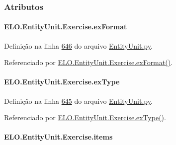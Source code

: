 \subsubsection{Atributos}
\hypertarget{classELO_1_1EntityUnit_1_1Exercise_a0d17db96aa0caa63df47795c50818e9f}{
\paragraph[{ex\-Format}]{\setlength{\rightskip}{0pt plus 5cm}E\-L\-O.\-Entity\-Unit.\-Exercise.\-ex\-Format}}\label{classELO_1_1EntityUnit_1_1Exercise_a0d17db96aa0caa63df47795c50818e9f}


Definição na linha \hyperlink{EntityUnit_8py_source_l00646}{646} do arquivo \hyperlink{EntityUnit_8py_source}{Entity\-Unit.\-py}.



Referenciado por \hyperlink{classELO_1_1EntityUnit_1_1Exercise_a5c495ffe5e6e424c1e4754dd07c06bc7}{E\-L\-O.\-Entity\-Unit.\-Exercise.\-ex\-Format()}.

\hypertarget{classELO_1_1EntityUnit_1_1Exercise_af982926b59b32980803f93f40b383d77}{
\paragraph[{ex\-Type}]{\setlength{\rightskip}{0pt plus 5cm}E\-L\-O.\-Entity\-Unit.\-Exercise.\-ex\-Type}}\label{classELO_1_1EntityUnit_1_1Exercise_af982926b59b32980803f93f40b383d77}


Definição na linha \hyperlink{EntityUnit_8py_source_l00645}{645} do arquivo \hyperlink{EntityUnit_8py_source}{Entity\-Unit.\-py}.



Referenciado por \hyperlink{classELO_1_1EntityUnit_1_1Exercise_aee62dc52d043fce780716fb395d88131}{E\-L\-O.\-Entity\-Unit.\-Exercise.\-ex\-Type()}.

\hypertarget{classELO_1_1EntityUnit_1_1Exercise_a14ec766ff723672be49ea5c9438744c8}{
\paragraph[{items}]{\setlength{\rightskip}{0pt plus 5cm}E\-L\-O.\-Entity\-Unit.\-Exercise.\-items}}\label{classELO_1_1EntityUnit_1_1Exercise_a14ec766ff723672be49ea5c9438744c8}


